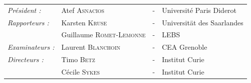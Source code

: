\documentclass[A4paperpaper,11pt,english]{sphinxmanual}
\begin{document}
\begin{center}
\begin{minipage}{0.75\linewidth}
\begin{center}
            \end{center}
            \begin{center}
            \noindent \large 
            \begin{tabular}{llcl}
                \textit{Président :}    & Atef            \textsc{Asnacios }       & - & Université Paris Diderot \\
                \textit{Rapporteurs :}  & Karsten \textsc{Kruse}           & - & Universität des Saarlandes \\
                                        & Guillaume         \textsc{Romet-Lemonne}   & - & LEBS\\
                            
                \textit{Examinateurs :} & Laurent           \textsc{Blanchoin}       & - & CEA Grenoble\\
                \textit{Directeurs : }  & Timo              \textsc{Betz}            & - & Institut Curie\\
                                        & Cécile          \textsc{Sykes}           & - & Institut Curie\\
                            
            \end{tabular}
            \end{center}
        \end{minipage}
    \end{center}
    \clearpage
    \null
    \thispagestyle{empty}%
    \addtocounter{page}{-1}%
    \newpage



\cleardoublepage
\pagestyle{normal}
\setlength{\headheight}{14pt}
 
\end{document}

